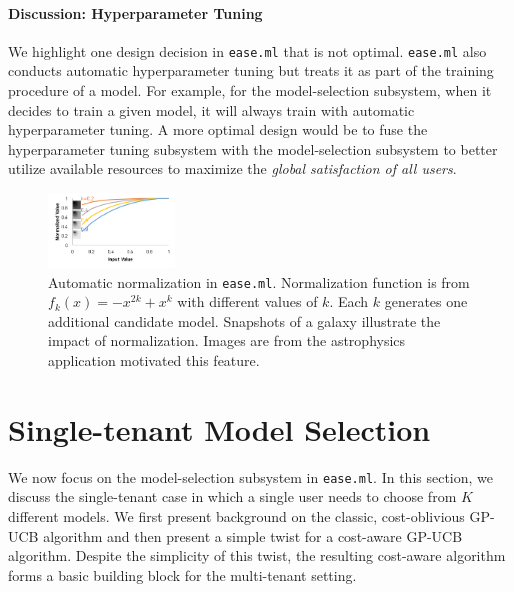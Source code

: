\documentclass[letterpaper]{vldb}
\newcommand{\eml}{\texttt{ease.ml}\xspace}
\begin{document}
\vspace{-0.5em}
\paragraph*{Discussion: Hyperparameter Tuning}
We highlight one design decision in \eml
that is not optimal. \eml also conducts automatic
hyperparameter tuning but treats it as part of the
training procedure of a model. For example, for the model-selection
subsystem, when it decides to train a given model,
it will always train with
automatic hyperparameter tuning. A more optimal design 
would be to fuse the hyperparameter tuning subsystem
with the model-selection subsystem to better
utilize available resources to maximize the
{\em global satisfaction of all users}.



\begin{figure}[t]
\centering
\includegraphics[width=0.3\textwidth]{figures/normalize}
\vspace{-2em}
\caption{Automatic normalization in \eml. Normalization function
is from $f_k(x) = -x^{2k} + x^{k}$ with different 
values of $k$. Each $k$ generates one additional candidate
model. Snapshots of a galaxy illustrate the impact of
normalization. Images are from the astrophysics 
application motivated this feature.}
 \label{fig:normalization}
\end{figure}



\section{Single-tenant Model Selection} \label{sec:singletenant}

We now focus on the model-selection subsystem in \eml. In this section,
we discuss the single-tenant case in which a single user needs to
choose from $K$ different models. We first present background on
the classic, cost-oblivious GP-UCB algorithm and then present a simple
twist for a cost-aware GP-UCB algorithm. Despite the simplicity of
this twist, the resulting cost-aware algorithm forms a basic building
block for the multi-tenant setting.

\vspace{-1em}
\end{document}
